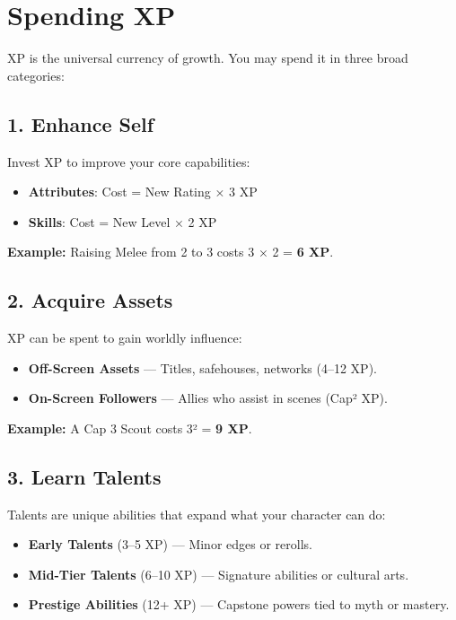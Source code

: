 \section{Spending XP}

XP is the universal currency of growth. You may spend it in three broad categories:

\subsection*{1. Enhance Self}

Invest XP to improve your core capabilities:

\begin{itemize}
  \item \textbf{Attributes}: Cost = New Rating × 3 XP
  \item \textbf{Skills}: Cost = New Level × 2 XP
\end{itemize}

\textbf{Example:} Raising Melee from 2 to 3 costs 3 × 2 = \textbf{6 XP}.

\subsection*{2. Acquire Assets}

XP can be spent to gain worldly influence:

\begin{itemize}
  \item \textbf{Off-Screen Assets} — Titles, safehouses, networks (4–12 XP).
  \item \textbf{On-Screen Followers} — Allies who assist in scenes (Cap² XP).
\end{itemize}

\textbf{Example:} A Cap 3 Scout costs 3² = \textbf{9 XP}.

\subsection*{3. Learn Talents}

Talents are unique abilities that expand what your character can do:

\begin{itemize}
  \item \textbf{Early Talents} (3–5 XP) — Minor edges or rerolls.
  \item \textbf{Mid-Tier Talents} (6–10 XP) — Signature abilities or cultural arts.
  \item \textbf{Prestige Abilities} (12+ XP) — Capstone powers tied to myth or mastery.
\end{itemize}

